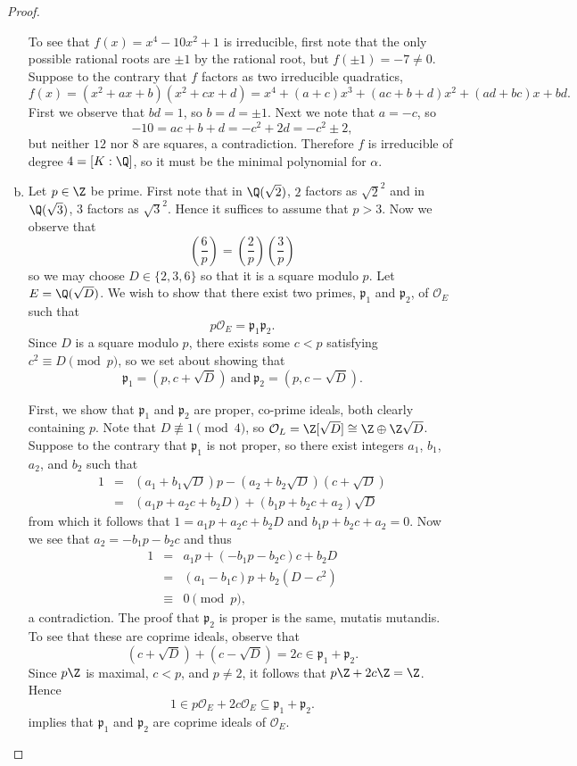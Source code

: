 \documentclass[10pt]{amsart}
\begin{document}
\begin{thm}
\begin{proof}
\begin{enumerate}[(a)]
			To see that $f(x) = x^4 - 10x^2 + 1$ is irreducible, first note that the only possible rational roots are $\pm 1$ by the rational root, but $f(\pm 1) = -7 \neq 0$.
			Suppose to the contrary that $f$ factors as two irreducible quadratics,
			$$f(x) = (x^2 + ax + b)(x^2 + cx + d) = x^4 + (a + c)x^3 + (ac + b + d)x^2 + (ad + bc)x + bd.$$
			First we observe that $bd = 1$, so $b = d = \pm 1$.
			Next we note that $a = -c$, so
			$$-10 = ac + b + d = -c^2 + 2d = -c^2 \pm 2,$$
			but neither $12$ nor $8$ are squares, a contradiction.
			Therefore $f$ is irreducible of degree $4 = [K : \Q]$, so it must be the minimal polynomial for $\alpha$.			
			\item
			Let $p \in \Z$ be prime.
			First note that in $\Q(\sqrt{2})$, $2$ factors as $\sqrt{2}^2$ and in $\Q(\sqrt{3})$, $3$ factors as $\sqrt{3}^2$.
			Hence it suffices to assume that $p > 3$.
			Now we observe that 
			$$\left(\frac{6}{p}\right) = \left(\frac{2}{p}\right)\left(\frac{3}{p}\right)$$
			so we may choose $D \in \{2,3,6\}$ so that it is a square modulo $p$.
			Let $E = \Q(\sqrt{D})$.
			We wish to show that there exist two primes, $\mathfrak{p}_1$ and $\mathfrak{p}_2$, of $\mathcal{O}_E$ such that 
			$$p\mathcal{O}_E = \mathfrak{p}_1\mathfrak{p}_2.$$
			Since $D$ is a square modulo $p$, there exists some $c < p$ satisfying $c^2 \equiv D \pmod{p}$, so we set about showing that
			$$\mathfrak{p}_1= (p, c + \sqrt{D})\ \text{and}\ \mathfrak{p}_2 = (p, c - \sqrt{D}).$$

			First, we show that $\mathfrak{p}_1$ and $\mathfrak{p}_2$ are proper, co-prime ideals, both clearly containing $p$.
			Note that $D \not \equiv 1 \pmod{4}$, so $\mathcal{O}_L = \Z[\sqrt{D}] \cong \Z \oplus \Z\sqrt{D}$.
			Suppose to the contrary that $\mathfrak{p}_1$ is not proper, so there exist integers $a_1$, $b_1$, $a_2$, and $b_2$ such that
			\begin{eqnarray*}
			1 &=& (a_1 + b_1\sqrt{D})p - (a_2 + b_2\sqrt{D})(c + \sqrt{D})\\
			&=& (a_1p + a_2c + b_2D) + (b_1p + b_2c + a_2)\sqrt{D}
			\end{eqnarray*} 
			from which it follows that $1 = a_1p + a_2c + b_2D$ and $b_1p + b_2c + a_2 = 0.$
			Now we see that $a_2 = -b_1p - b_2c$ and thus
			\begin{eqnarray*}
				1 &=& a_1p + (-b_1p - b_2c)c + b_2D\\
				&=& (a_1 - b_1c)p + b_2(D - c^2)\\
				&\equiv & 0 \pmod{p},
			\end{eqnarray*}
			a contradiction.
			The proof that $\mathfrak{p}_2$ is proper is the same, mutatis mutandis.
			To see that these are coprime ideals, observe that
			$$(c + \sqrt{D}) + (c - \sqrt{D}) = 2c \in \mathfrak{p}_1 + \mathfrak{p}_2.$$
			Since $p\Z$ is maximal, $c < p$, and $p \neq 2$, it follows that $p\Z + 2c\Z = \Z$.
			Hence 
			$$1 \in p\mathcal{O}_E + 2c\mathcal{O}_E \subseteq \mathfrak{p}_1 + \mathfrak{p}_2.$$
			implies that $\mathfrak{p}_1$ and $\mathfrak{p}_2$ are coprime ideals of $\mathcal{O}_E$.


\end{enumerate}
\end{proof}
\end{thm}
\end{document}
